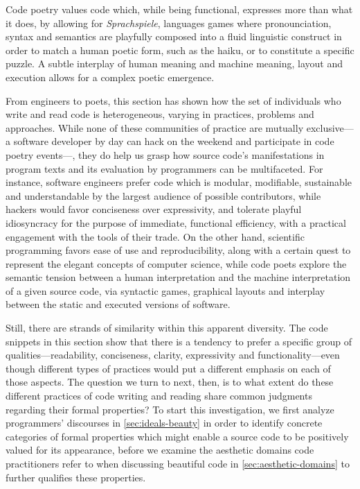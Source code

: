 Code poetry values code which, while being functional, expresses more than what it does, by allowing for \emph{Sprachspiele}, languages games where pronounciation, syntax and semantics are playfully composed into a fluid linguistic construct in order to match a human poetic form, such as the haiku, or to constitute a specific puzzle. A subtle interplay of human meaning and machine meaning, layout and execution allows for a complex poetic emergence.

\spacer

From engineers to poets, this section has shown how the set of individuals who write and read code is heterogeneous, varying in practices, problems and approaches. While none of these communities of practice are mutually exclusive—a software developer by day can hack on the weekend and participate in code poetry events—, they do help us grasp how source code's manifestations in program texts and its evaluation by programmers can be multifaceted. For instance, software engineers prefer code which is modular, modifiable, sustainable and understandable by the largest audience of possible contributors, while hackers would favor conciseness over expressivity, and tolerate playful idiosyncracy for the purpose of immediate, functional efficiency, with a practical engagement with the tools of their trade. On the other hand, scientific programming favors ease of use and reproducibility, along with a certain quest to represent the elegant concepts of computer science, while code poets explore the semantic tension between a human interpretation and the machine interpretation of a given source code, via syntactic games, graphical layouts and interplay between the static and executed versions of software.

Still, there are strands of similarity within this apparent diversity. The code snippets in this section show that there is a tendency to prefer a specific group of qualities—readability, conciseness, clarity, expressivity and functionality—even though different types of practices would put a different emphasis on each of those aspects. The question we turn to next, then, is to what extent do these different practices of code writing and reading share common judgments regarding their formal properties?  To start this investigation, we first analyze programmers' discourses in \ref{sec:ideals-beauty} in order to identify concrete categories of formal properties which might enable a source code to be positively valued for its appearance, before we examine the aesthetic domains code practitioners refer to when discussing beautiful code in \ref{sec:aesthetic-domains} to further qualifies these properties.

